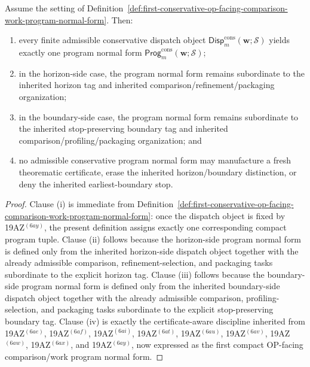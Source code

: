 \begin{proposition}
\label{prop:every-finite-admissible-conservative-dispatch-object-yields-exactly-one-conservative-comparison-work-program-normal-form}
Assume the setting of Definition~\ref{def:first-conservative-op-facing-comparison-work-program-normal-form}. Then:
\begin{enumerate}[label=(\roman*)]
  \item every finite admissible conservative dispatch object \(\mathsf{Disp}^{\mathrm{cons}}_{m}(\mathbf w;\mathcal S)\) yields exactly one program normal form \(\mathsf{Prog}^{\mathrm{cons}}_{m}(\mathbf w;\mathcal S)\);
  \item in the horizon-side case, the program normal form remains subordinate to the inherited horizon tag and inherited comparison/refinement/packaging organization;
  \item in the boundary-side case, the program normal form remains subordinate to the inherited stop-preserving boundary tag and inherited comparison/profiling/packaging organization; and
  \item no admissible conservative program normal form may manufacture a fresh theorematic certificate, erase the inherited horizon/boundary distinction, or deny the inherited earliest-boundary stop.
\end{enumerate}
\end{proposition}

\begin{proof}
Clause (i) is immediate from Definition~\ref{def:first-conservative-op-facing-comparison-work-program-normal-form}: once the dispatch object is fixed by 19AZ$^{(6ay)}$, the present definition assigns exactly one corresponding compact program tuple. Clause (ii) follows because the horizon-side program normal form is defined only from the inherited horizon-side dispatch object together with the already admissible comparison, refinement-selection, and packaging tasks subordinate to the explicit horizon tag. Clause (iii) follows because the boundary-side program normal form is defined only from the inherited boundary-side dispatch object together with the already admissible comparison, profiling-selection, and packaging tasks subordinate to the explicit stop-preserving boundary tag. Clause (iv) is exactly the certificate-aware discipline inherited from 19AZ$^{(6ae)}$, 19AZ$^{(6af)}$, 19AZ$^{(6ai)}$, 19AZ$^{(6at)}$, 19AZ$^{(6au)}$, 19AZ$^{(6av)}$, 19AZ$^{(6aw)}$, 19AZ$^{(6ax)}$, and 19AZ$^{(6ay)}$, now expressed as the first compact OP-facing comparison/work program normal form.
\end{proof}

